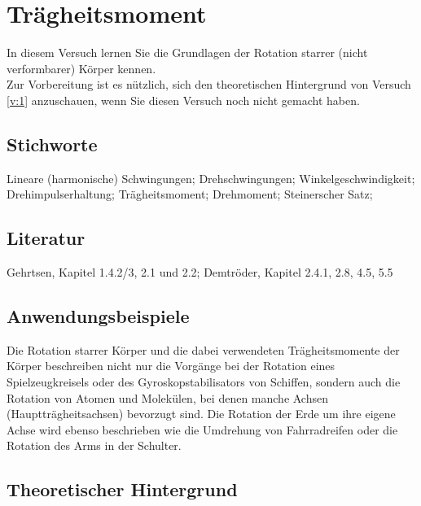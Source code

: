 \chapter{Trägheitsmoment}
\label{v:2}

In diesem Versuch lernen Sie die Grundlagen der Rotation starrer (nicht verformbarer) Körper kennen.\\
Zur Vorbereitung ist es nützlich, sich den theoretischen Hintergrund von Versuch \ref{v:1} anzuschauen, wenn Sie diesen Versuch noch nicht gemacht haben.
\section{Stichworte}
Lineare (harmonische) Schwingungen; Drehschwingungen; Winkelgeschwindigkeit; Drehimpulserhaltung; Trägheitsmoment; Drehmoment; Steinerscher Satz; 
%
\section{Literatur}
Gehrtsen, Kapitel 1.4.2/3, 2.1 und 2.2; Demtröder, Kapitel 2.4.1, 2.8, 4.5, 5.5
%
\section{Anwendungsbeispiele}
%
Die Rotation starrer Körper und die dabei verwendeten Trägheitsmomente der Körper beschreiben nicht nur die Vorgänge bei der Rotation eines Spielzeugkreisels oder des Gyroskopstabilisators von Schiffen, sondern auch die Rotation von Atomen und Molekülen, bei denen manche Achsen (Hauptträgheitsachsen) bevorzugt sind. Die Rotation der Erde um ihre eigene Achse wird ebenso beschrieben wie die Umdrehung von Fahrradreifen oder die Rotation des Arms in der Schulter.
%
\section{Theoretischer Hintergrund}


